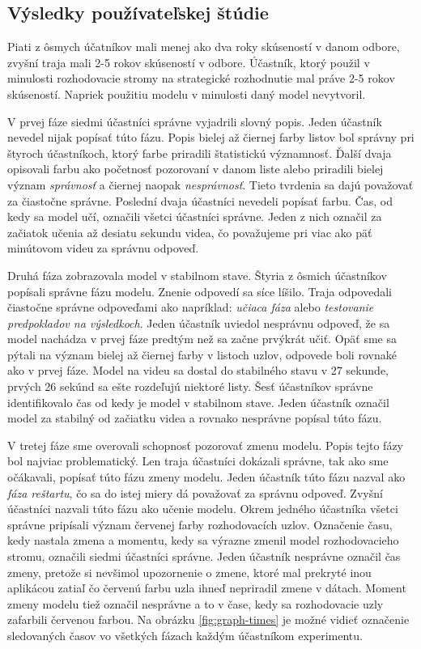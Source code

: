 

\subsection{Výsledky používateľskej štúdie}
Piati z ôsmych účatníkov mali menej ako dva roky skúseností v danom odbore, zvyšní traja mali 2-5 rokov skúseností v odbore. Účastník, ktorý použil v minulosti rozhodovacie stromy na strategické rozhodnutie mal práve 2-5 rokov skúseností. Napriek použitiu modelu v minulosti daný model nevytvoril.
\par
V prvej fáze siedmi účastníci správne vyjadrili slovný popis. Jeden účastník nevedel nijak popísať túto fázu. Popis bielej až čiernej farby listov bol správny pri štyroch účastníkoch, ktorý farbe priradili štatistickú významnosť. Ďalší dvaja opisovali farbu ako početnosť pozorovaní v danom liste alebo priradili bielej význam \textit{správnosť} a čiernej naopak \textit{nesprávnosť}. Tieto tvrdenia sa dajú považovať za čiastočne správne. Poslední dvaja účastníci nevedeli popísať farbu. Čas, od kedy sa model učí, označili všetci účastníci správne. Jeden z nich označil za začiatok učenia až desiatu sekundu videa, čo považujeme pri viac ako päť minútovom videu za správnu odpoveď.
\par
Druhá fáza zobrazovala model v stabilnom stave. Štyria z ôsmich účastníkov popísali správne fázu modelu. Znenie odpovedí sa síce líšilo. Traja odpovedali čiastočne správne odpoveďami ako napríklad: \textit{učiaca fáza} alebo \textit{testovanie predpokladov na výsledkoch}. Jeden účastník uviedol nesprávnu odpoveď, že sa model nachádza v prvej fáze predtým než sa začne prvýkrát učiť. Opäť sme sa pýtali na význam bielej až čiernej farby v listoch uzlov, odpovede boli rovnaké ako v prvej fáze. Model na videu sa dostal do stabilného stavu v 27 sekunde, prvých 26 sekúnd sa ešte rozdeľujú niektoré listy. Šesť účastníkov správne identifikovalo čas od kedy je model v stabilnom stave. Jeden účastník označil model za stabilný od začiatku videa a rovnako nesprávne popísal túto fázu.
\par
V tretej fáze sme overovali schopnosť pozorovať zmenu modelu. Popis tejto fázy bol najviac problematický. Len traja účastníci dokázali správne, tak ako sme očákavali, popísať túto fázu zmeny modelu. Jeden účastník túto fázu nazval ako \textit{fáza reštartu}, čo sa do istej miery dá považovať za správnu odpoveď. Zvyšní účastníci nazvali túto fázu ako učenie modelu. Okrem jedného účastníka všetci správne pripísali význam červenej farby rozhodovacích uzlov. Označenie času, kedy nastala zmena a momentu, kedy sa výrazne zmenil model rozhodovacieho stromu, označili siedmi účastníci správne. Jeden účastník nesprávne označil čas zmeny, pretože si nevšimol upozornenie o zmene, ktoré mal prekryté inou aplikácou zatiaľ čo červenú farbu uzla ihneď nepriradil zmene v dátach. Moment zmeny modelu tiež označil nesprávne a to v čase, kedy sa rozhodovacie uzly zafarbili červenou farbou. Na obrázku \ref{fig:graph-times} je možné vidieť označenie sledovaných časov vo všetkých fázach každým účastníkom experimentu.
